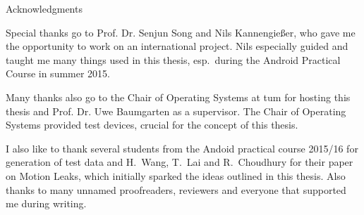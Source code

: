 \thispagestyle{empty}

\vspace*{2cm}

\begin{center}
{ Acknowledgments}
\end{center}

\vspace{1cm}

Special thanks go to Prof. Dr. Senjun Song and Nils Kannengießer, who gave me the opportunity to work on an international project. Nils especially guided and taught me many things used in this thesis, esp.\ during the Android Practical Course in summer 2015.

Many thanks also go to the Chair of Operating Systems at \gls{tum} for hosting this thesis and Prof. Dr. Uwe Baumgarten as a supervisor. The Chair of Operating Systems provided test devices, crucial for the concept of this thesis.

I also like to thank several students from the Andoid practical course 2015/16 for generation of test data and H.\ Wang, T.\ Lai and R.\ Choudhury for their paper on Motion Leaks\cite{wang2015mole}, which initially sparked the ideas outlined in this thesis. Also thanks to many unnamed proofreaders, reviewers and everyone that supported me during writing.

\cleardoublepage{}
